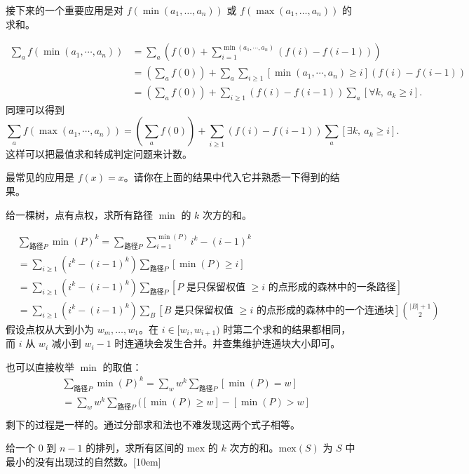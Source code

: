 接下来的一个重要应用是对 $f(\min(a_1,\ldots,a_n))$ 或 $f(\max(a_1,\ldots,a_n))$ 的求和。
\begin{example}
    $$
    \begin{aligned}
    \sum_a f(\min(a_1,\cdots,a_n))&=\sum_a \left(f(0)+\sum_{i=1}^{\min(a_1,\cdots,a_n)}(f(i)-f(i-1))\right)\\
    &=\left(\sum_a f(0)\right)+\sum_a\sum_{i\ge 1}[\min(a_1,\cdots,a_n)\ge i](f(i)-f(i-1))\\
    &=\left(\sum_a f(0)\right)+\sum_{i\ge 1}(f(i)-f(i-1))\sum_a[\forall k,\ a_k\ge i].
    \end{aligned}
    $$
    同理可以得到
    $$
    \sum_a f(\max(a_1,\cdots,a_n))=\left(\sum_a f(0)\right)+\sum_{i\ge 1}(f(i)-f(i-1))\sum_a [\exists k,\ a_k\ge i].
    $$
    这样可以把最值求和转成判定问题来计数。
\end{example}
\begin{remark}
    最常见的应用是 $f(x)=x$。请你在上面的结果中代入它并熟悉一下得到的结果。
\end{remark}
\begin{exercise}
    给一棵树，点有点权，求所有路径 $\min$ 的 $k$ 次方的和。
\end{exercise}
\begin{solution}
    $$
    \begin{aligned}
        &\sum_{\text{路径}P}\min(P)^k=\sum_{\text{路径}P}\sum_{i=1}^{\min(P)}i^k-(i-1)^k\\
        &=\sum_{i\ge 1}(i^k-(i-1)^k)\sum_{\text{路径}P}[\min(P)\ge i]\\
        &=\sum_{i\ge 1}(i^k-(i-1)^k)\sum_{\text{路径}P}[P\text{ 是只保留权值 }\ge i \text{ 的点形成的森林中的一条路径}]\\
        &=\sum_{i\ge 1}(i^k-(i-1)^k)\sum_{B}[B\text{ 是只保留权值 }\ge i\text{ 的点形成的森林中的一个连通块}]\binom{|B|+1}{2}
    \end{aligned}
    $$
    假设点权从大到小为 $w_m,\ldots,w_1$。在 $i\in [w_i,w_{i+1})$ 时第二个求和的结果都相同，而 $i$ 从 $w_i$ 减小到 $w_i-1$ 时连通块会发生合并。并查集维护连通块大小即可。
\end{solution}
\begin{solution}[另解]
    也可以直接枚举 $\min$ 的取值：
    $$
    \begin{aligned}
        &\sum_{\text{路径}P}\min(P)^k=\sum_w w^k\sum_{\text{路径}P}[\min(P)=w]\\
        &=\sum_{w}w^k\sum_{\text{路径}P}([\min(P)\ge w]-[\min(P)>w]\\
    \end{aligned}
    $$
    剩下的过程是一样的。通过分部求和法也不难发现这两个式子相等。
\end{solution}
\begin{exercise}
    给一个 $0$ 到 $n-1$ 的排列，求所有区间的 $\mathrm{mex}$ 的 $k$ 次方的和。$\mathrm{mex}(S)$ 为 $S$ 中最小的没有出现过的自然数。[10em]
\end{exercise}
  
